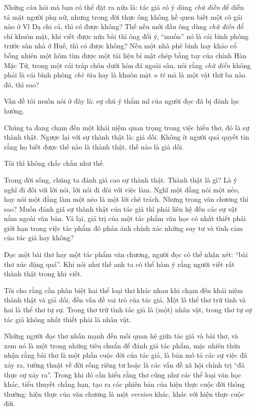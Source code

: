 \documentclass[../main.tex]{subfiles}
\begin{document}
\begin{multicols}{2}
Những câu hỏi mà bạn có thể đặt ra nữa là: tác giả có ý dùng \textit{chữ điền} để diễn tả mặt người phụ nữ, nhưng trong đời thực ông không hề quen biết một cô gái nào ở Vĩ Dạ chi cả, thì có được không? Thế nếu mới đầu ông dùng \textit{chữ điền} để chỉ khuôn mặt, khi viết được nửa bài thì ông đổi ý, “muốn” nó là cái bình phông trước sân nhà ở Huế, thì có được không? Nếu một nhà phê bình hay khảo cổ bỗng nhiên một hôm tìm được một tài liệu bí mật chép bằng tay của chính Hàn Mặc Tử, trong một cái tráp chôn dưới hòn đá ngoài sân, nói rằng \textit{chữ điền} không phải là cái bình phông \textit{chè tàu} hay là khuôn mặt \textit{o tê} mà là một vật thứ ba nào đó, thì sao? 

Vấn đề tôi muốn nói ở đây là: sự chú ý thẩm mĩ của người đọc đã bị đánh lạc hướng. 

Chúng ta đang chạm đến một khái niệm quan trọng trong việc hiểu thơ, đó là sự thành thật. Ngược lại với sự thành thật là: giả dối. Không ít người quả quyết tin rằng họ biết được thế nào là thành thật, thế nào là giả dối. 

Tôi thì không chắc chắn như thế. 

Trong đời sống, chúng ta đánh giá cao sự thành thật. Thành thật là gì? Là ý nghĩ đi đôi với lời nói, lời nói đi đôi với việc làm. Nghĩ một đằng nói một nẻo, hay nói một đằng làm một nẻo là một lời chê trách. Nhưng trong văn chương thì sao? Muốn đánh giá sự thành thật của tác giả thì phải liên hệ đến các sự vật nằm ngoài văn bản. Vả lại, giá trị của một tác phẩm văn học có nhất thiết phải giới hạn trong việc tác phẩm đó phản ảnh chính xác những suy tư và tình cảm của tác giả hay không? 

Đọc một bài thơ hay một tác phẩm văn chương, người đọc có thể nhận xét: “bài thơ xúc động quá”. Khi nói như thế anh ta có thể hàm ý rằng người viết rất thành thật trong khi viết. 

Tôi cho rằng cần phân biệt hai thể loại thơ khác nhau khi chạm đến khái niệm thành thật và giả dối, đến vấn đề vai trò của tác giả. Một là thể thơ trữ tình và hai là thể thơ tự sự. Trong thơ trữ tình tác giả là (một) nhân vật, trong thơ tự sự tác giả không nhất thiết phải là nhân vật. 

Những người đọc thơ nhấn mạnh đến mối quan hệ giữa tác giả và bài thơ, và xem nó là một trong những tiêu chuẩn để đánh giá tác phẩm, mặc nhiên thừa nhận rằng bài thơ là một phần cuộc đời của tác giả, là bản mô tả các sự việc đã xảy ra, tường thuật về đời sống riêng tư hoặc là các vấn đề xã hội chính trị “đã thực sự xảy ra”. Trong khi đó cần hiểu rằng thơ cũng như các thể loại văn học khác, tiểu thuyết chẳng hạn, tạo ra các phiên bản của hiện thực cuộc đời thông thường: hiện thực của văn chương là một \textit{version} khác, khác với hiện thực cuộc đời. 


\end{multicols}
\end{document}

